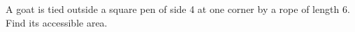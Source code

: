 A goat is tied outside a square pen of side 4 at one corner by a rope of length 6. Find its accessible area.
